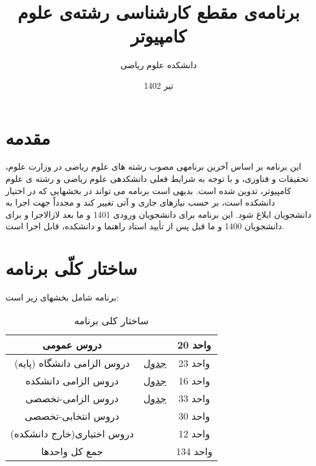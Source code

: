 \documentclass{article}
\title{
    برنامه‌ی مقطع کارشناسی رشته‌ی علوم کامپیوتر
}
\author{
    دانشکده علوم ریاضی
}
\date{
    تیر 1402
}
\begin{document}
    \maketitle
    \section{مقدمه }
    این برنامه بر اساس آخرین برنامهی مصوب رشته های علوم ریاضی در وزارت علوم، تحقیقات و فناوری، و با توجه به شرایط فعلی دانشکدهی علوم ریاضی و رشته ی علوم کامپیوتر، تدوین شده است. بدیهی است برنامه می تواند در بخشهایی که در اختیار دانشکده است، بر حسب نیازهای جاری و آتی تغییر کند و مجدداً جهت اجرا به دانشجویان ابلاغ شود. این برنامه برای دانشجویان ورودی 1401 و ما بعد لازالاجرا و برای دانشجویان 1400 و ما قبل پس از تأیید استاد راهنما و دانشکده، قابل اجرا است.
    
\pagebreak
\tableofcontents
\pagebreak
\listoftables
\newpage
\section{ساختار کلّی برنامه}
    برنامه شامل بخشهای زیر است:
\begin{table}[H]
\begin{center}
        \begin{tabular}{|c | c | c|}
            \hline
            {دروس عمومی} & & {20 واحد} \\
            \hline
            {دروس الزامی دانشگاه (پایه)}\LR{)} & {
            \href{cs-t1}{
            	جدول 
            }
            } & {23 واحد} \\
            \hline
            {دروس الزامی دانشکده} & {
            \href{cs-t2}{
            	جدول 
            }
            } & {16 واحد} \\
            \hline
            {دروس الزامی-تخصصی} & {
            	\href{cs-t3}{
            		جدول 
            	}
            	} & {33 واحد} \\
            \hline
            {دروس انتخابی-تخصصی} & & {30 واحد} \\
            \hline
            {دروس اختیاری(خارج دانشکده) } & & {12 واحد} \\
            \hline
            {جمع کل واحدها} & & {134 واحد} \\
            \hline
        \end{tabular}
		\caption{\label{cs-t1}
	ساختار کلی برنامه
		}
    \end{center}
\end{table}
\end{document}
